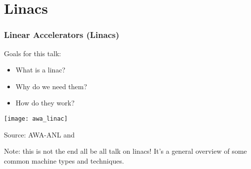 \documentclass[professionalfonts,t]{beamer}
\begin{document}
\section{Linacs}

\begin{frame}
	\frametitle{Linear Accelerators (Linacs)}
	
	\vspace{1em}
	Goals for this talk:
	
	\begin{minipage}{0.43\textwidth}
		\begin{itemize}
			\item What is a linac?
			\item Why do we need them?
			\item How do they work?
		\end{itemize}
	\end{minipage}
\begin{minipage}{0.55\textwidth}
	\centering
	\texttt{[image: awa\_linac]}
	
	Source: AWA-ANL and 
\end{minipage}

\vspace{1em}
Note: this is not the end all be all talk on linacs!
It's a general overview of some common machine types and techniques.

\end{frame}
\end{document}
